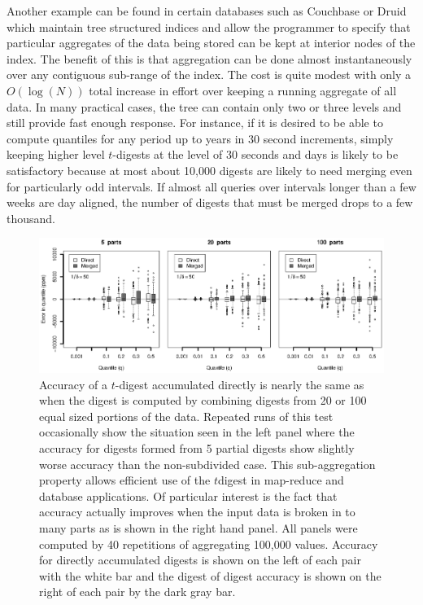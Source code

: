 \documentclass[11pt]{amsart}
\begin{document}
Another example can be found in certain databases such as Couchbase or Druid which maintain tree structured indices and allow the programmer to specify that particular aggregates of the data being stored can be kept at interior nodes of the index.  The benefit of this is that aggregation can be done almost instantaneously over any contiguous sub-range of the index.  The cost is quite modest with only a $O(\log(N))$ total increase in effort over keeping a running aggregate of all data.  In many practical cases, the tree can contain only two or three levels and still provide fast enough response.  For instance, if it is desired to be able to compute quantiles for any period up to years in 30 second increments, simply keeping higher level $t$-digests at the level of 30 seconds and days is likely to be satisfactory because at most about 10,000 digests are likely to need merging even for particularly odd intervals.  If almost all queries over intervals longer than a few weeks are day aligned, the number of digests that must be merged drops to a few thousand.
\begin{figure}[htb] %
   \centering
   \includegraphics[width=6in]{merge.eps} 
   \caption{Accuracy of a $t$-digest accumulated directly is nearly the same as when the digest is computed by combining digests from 20 or 100 equal sized portions of the data.  Repeated runs of this test occasionally show the situation seen in the left panel where the accuracy for digests formed from 5 partial digests show slightly worse accuracy than the non-subdivided case.  This sub-aggregation property allows efficient use of the $t$digest in map-reduce and database applications.  Of particular interest is the fact that accuracy actually improves when the input data is broken in to many parts as is shown in the right hand panel.  All panels were computed by 40 repetitions of aggregating 100,000 values. Accuracy for directly accumulated digests is shown on the left of each pair with the white bar and the digest of digest accuracy is shown on the right of each pair by the dark gray bar.}
   \label{fig:merge}
\end{figure}
\end{document}

